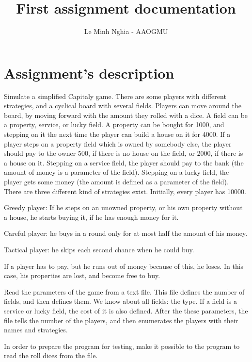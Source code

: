 \documentclass[a4paper, 12pt]{report}
\begin{document}
\title{First assignment documentation}
\author{Le Minh Nghia - AAOGMU}
\maketitle
{}
\tableofcontents

\chapter{Assignment's description}
	Simulate a simplified Capitaly game. There are some players with different strategies, and a
cyclical board with several fields. Players can move around the board, by moving forward with
the amount they rolled with a dice. A field can be a property, service, or lucky field.
A property can be bought for 1000, and stepping on it the next time the player can build a house
on it for 4000. If a player steps on a property field which is owned by somebody else, the player
should pay to the owner 500, if there is no house on the field, or 2000, if there is a house on it.
Stepping on a service field, the player should pay to the bank (the amount of money is a
parameter of the field). Stepping on a lucky field, the player gets some money (the amount is
defined as a parameter of the field). There are three different kind of strategies exist. Initially,
every player has 10000.

Greedy player: If he steps on an unowned property, or his own property without a house, he
starts buying it, if he has enough money for it.

Careful player: he buys in a round only for at most half the amount of his money.

Tactical player: he skips each second chance when he could buy.

If a player has to pay, but he runs out of money because of this, he loses. In this case, his
properties are lost, and become free to buy.

Read the parameters of the game from a text file. This file defines the number of fields, and then
defines them. We know about all fields: the type. If a field is a service or lucky field, the cost of it
is also defined. After the these parameters, the file tells the number of the players, and then
enumerates the players with their names and strategies.

In order to prepare the program for testing, make it possible to the program to read the roll dices
from the file.
\end{document}
